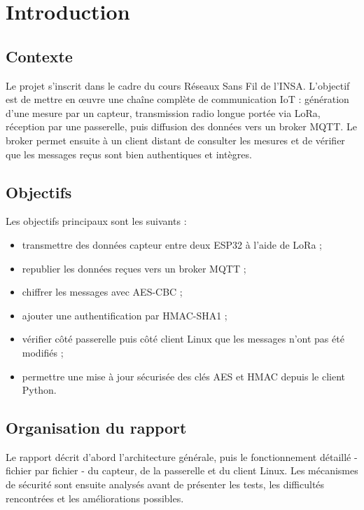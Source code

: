 \documentclass[a4paper,11pt]{report}
\begin{document}
\tableofcontents
\listoffigures
\listoftables

\chapter{Introduction}
\label{chap:intro}

\section{Contexte}
Le projet s'inscrit dans le cadre du cours Réseaux Sans Fil de l'INSA. L'objectif est de mettre en
œuvre une chaîne complète de communication IoT : génération d'une mesure par un capteur, transmission
radio longue portée via LoRa, réception par une passerelle, puis diffusion des données vers un broker
MQTT. Le broker permet ensuite à un client distant de consulter les mesures et de vérifier que les
messages reçus sont bien authentiques et intègres.

\section{Objectifs}
Les objectifs principaux sont les suivants :
\begin{itemize}
    \item transmettre des données capteur entre deux ESP32 à l'aide de LoRa ;
    \item republier les données reçues vers un broker MQTT ;
    \item chiffrer les messages avec AES-CBC ;
    \item ajouter une authentification par HMAC-SHA1 ;
    \item vérifier côté passerelle puis côté client Linux que les messages n'ont pas été modifiés ;
    \item permettre une mise à jour sécurisée des clés AES et HMAC depuis le client Python.
\end{itemize}

\section{Organisation du rapport}
Le rapport décrit d'abord l'architecture générale, puis le fonctionnement détaillé - fichier par
fichier - du capteur, de la passerelle et du client Linux. Les mécanismes de sécurité sont ensuite
analysés avant de présenter les tests, les difficultés rencontrées et les améliorations possibles.
\end{document}
